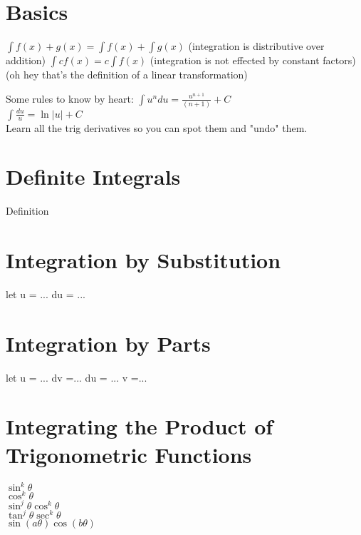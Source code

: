 \documentclass[letterpaper,normalheadings,twocolumn]{scrreprt}
\begin{document}
\section{Basics}%
$\int{f(x) + g(x)} = \int{f(x)} + \int{g(x)}$ (integration is distributive over addition)
$\int{cf(x)} = c\int{f(x)}$ (integration is not effected by constant factors)
(oh hey that's the definition of a linear transformation)

Some rules to know by heart:
$\int{u^{n}du} = \frac{u^{n+1}}{(n+1)} + C$\\
$\int{\frac{du}{u}} = \ln{|u|} + C$\\
Learn all the trig derivatives so you can spot them and "undo" them.

\section{Definite Integrals}%
Definition

\section{Integration by Substitution}%
let u = ...
du = ...

\section{Integration by Parts}
let u = ... dv =...
du = ... v =...

\section{Integrating the Product of Trigonometric Functions}%

$\sin^k\theta$ \\
$\cos^k\theta$ \\
$\sin^j\theta\cos^k\theta$ \\
$\tan^j\theta\sec^k\theta$ \\
$\sin(a\theta)\cos(b\theta)$ \\
\end{document}
